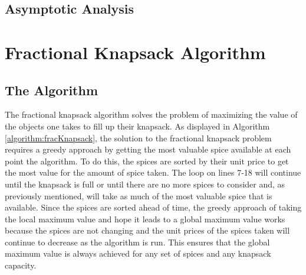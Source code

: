 \documentclass[letterpaper, 10pt,DIV=13]{scrartcl}
\numberwithin{equation}{section} %
\numberwithin{figure}{section} %
\numberwithin{table}{section} %
\begin{document}
\subsection{Asymptotic Analysis}

\section{Fractional Knapsack Algorithm}
\subsection{The Algorithm}
The fractional knapsack algorithm solves the problem of maximizing the value of the objects one takes to fill up their knapsack. As displayed in Algorithm \ref{algorithm:fracKnapsack}, the solution to the fractional knapsack problem requires a greedy approach by getting the most valuable spice available at each point the algorithm. To do this, the spices are sorted by their unit price to get the most value for the amount of spice taken. The loop on lines 7-18 will continue until the knapsack is full or until there are no more spices to consider and, as previously mentioned, will take as much of the most valuable spice that is available. Since the spices are sorted ahead of time, the greedy approach of taking the local maximum value and hope it leads to a global maximum value works because the spices are not changing and the unit prices of the spices taken will continue to decrease as the algorithm is run. This ensures that the global maximum value is always achieved for any set of spices and any knapsack capacity.
\end{document}
